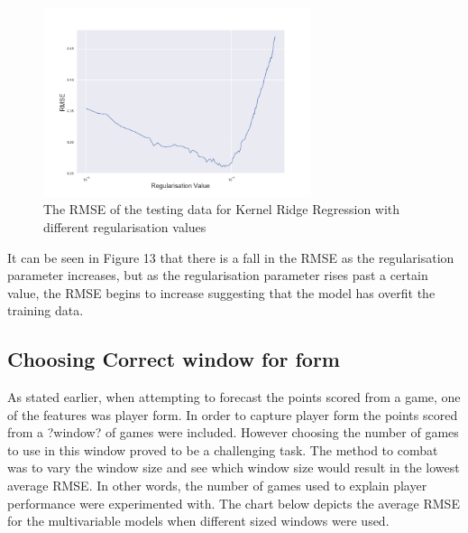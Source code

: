 \documentclass[a4paper,11pt,twoside]{article}
\begin{document}
      \begin{figure}[!htb]
        \centerline{\includegraphics[width=0.7\textwidth]
        {../errvals.png}}
        \caption{\label{fig:my-label} The RMSE of the testing data for Kernel Ridge Regression with different regularisation values}
      \end{figure}


It can be seen in Figure 13 that there is a fall in the RMSE as the regularisation parameter increases, but as the regularisation parameter rises past a certain value, the RMSE begins to increase suggesting that the model has overfit the training data.



\subsection{Choosing Correct window for form}

As stated earlier, when attempting to forecast the points scored from a game, one of the features was player form. In order to capture player form the points scored from a ?window? of games were included. However choosing the number of games to use in this window proved to be a challenging task. The method to combat was to vary the window size and see which window size would result in the lowest average RMSE. In other words, the number of games used to explain player performance were experimented with. The chart below depicts the average RMSE for the multivariable models when different sized windows were used. 
\end{document}
